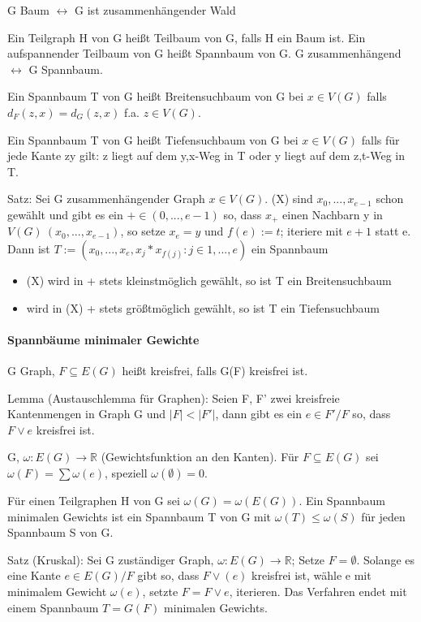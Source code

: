 \documentclass[a4paper]{article}
\begin{document}
\begin{multicols}{3}
    G Baum $\leftrightarrow$ G ist zusammenhängender Wald
    
    Ein Teilgraph H von G heißt Teilbaum von G, falls H ein Baum ist. Ein aufspannender Teilbaum von G heißt Spannbaum von G. G zusammenhängend $\leftrightarrow$ G Spannbaum.
    
    Ein Spannbaum T von G heißt Breitensuchbaum von G bei $x\in V(G)$ falls $d_F(z,x)=d_G(z,x)$ f.a. $z\in V(G)$.
    
    Ein Spannbaum T von G heißt Tiefensuchbaum von G bei $x\in V(G)$ falls für jede Kante zy gilt: z liegt auf dem y,x-Weg in T oder y liegt auf dem z,t-Weg in T.
    
    Satz: Sei G zusammenhängender Graph $x\in V(G)$.
    (X) sind $x_0,...,x_{e-1}$ schon gewählt und gibt es ein $+ \in (0,..., e-1)$ so, dass $x_{+}$ einen Nachbarn y in $V(G)\ (x_0,...,x_{e-1} )$, so setze $x_e=y$ und $f(e):=t$; iteriere mit $e+1$ statt e.
    Dann ist $T:=({x_0,...,x_e},{x_j*x_{f(j)}: j\in {1,...,e}})$ ein Spannbaum
    \begin{itemize}
        \item (X) wird in + stets kleinstmöglich gewählt, so ist T ein Breitensuchbaum
        \item wird in (X) + stets größtmöglich gewählt, so ist T ein Tiefensuchbaum
    \end{itemize}
    
    \paragraph{Spannbäume minimaler Gewichte}
    G Graph, $F \subseteq E(G)$ heißt kreisfrei, falls G(F) kreisfrei ist.
    
    Lemma (Austauschlemma für Graphen):
    Seien F, F' zwei kreisfreie Kantenmengen in Graph G und $|F|<|F'|$, dann gibt es ein $e \in F'/F$ so, dass $F\vee {e}$ kreisfrei ist.
    
    G, $\omega:E(G)\rightarrow \mathbb{R}$ (Gewichtsfunktion an den Kanten). Für $F\subseteq E(G)$ sei $\omega (F)=\sum \omega (e)$, speziell $\omega (\emptyset)=0$.
    
    Für einen Teilgraphen H von G sei $\omega (G)=\omega (E(G))$. Ein Spannbaum minimalen Gewichts ist ein Spannbaum T von G mit $\omega (T)\leq \omega (S)$ für jeden Spannbaum S von G.
    
    Satz (Kruskal): Sei G zuständiger Graph, $\omega:E(G)\rightarrow \mathbb{R}$; Setze $F=\emptyset$. Solange es eine Kante $e\in E(G)/F$ gibt so, dass $F \vee (e)$ kreisfrei ist, wähle e mit minimalem Gewicht $\omega(e)$, setzte $F=F\vee {e}$, iterieren. Das Verfahren endet mit einem Spannbaum $T=G(F)$ minimalen Gewichts.
    

\end{multicols}
\end{document}
